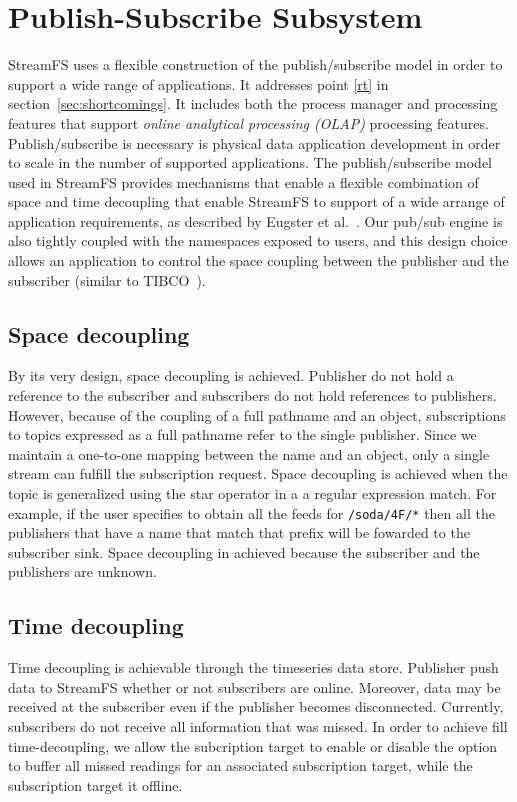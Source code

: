 \section{Publish-Subscribe Subsystem}
\label{sec:ProcMngtSchedMain}

StreamFS uses a flexible construction of the publish/subscribe model in order to support a wide range of applications.
It addresses point \ref{rt} in section~\ref{sec:shortcomings}.  It includes both the process manager and processing
features that support \emph{online analytical processing (OLAP)} processing features.
Publish/subscribe is necessary is physical data application development in order to scale in the number of supported
applications.  The publish/subscribe model used in StreamFS provides mechanisms that enable a flexible combination 
of space and time decoupling that enable StreamFS to support of a wide arrange of application requirements, as described by
Eugster et al.~\cite{eugster}.
Our pub/sub engine is also tightly coupled with the namespaces exposed to users, and this design choice allows an application
to control the space coupling between the publisher and the subscriber (similar to TIBCO~\cite{tibco}).  

\subsection{Space decoupling}
By its very design, space decoupling is achieved.  Publisher do not hold a reference to the subscriber and subscribers do not
hold references to publishers.  However, because of the coupling of a full pathname and an object, subscriptions to topics
expressed as a full pathname refer to the single publisher.  Since we maintain a one-to-one mapping between the
name and an object, only a single stream can fulfill the subscription request.  Space decoupling is achieved when the 
topic is generalized using the star operator in a a regular expression match.  For example, if the user specifies
to obtain all the feeds for \texttt{/soda/4F/*} then all the publishers that have a name that match that prefix will be fowarded
to the subscriber sink.  Space decoupling in achieved because the subscriber and the publishers are unknown.

\subsection{Time decoupling}
Time decoupling is achievable through the timeseries data store.  Publisher push data to StreamFS whether or not subscribers are
online.  Moreover, data may be received at the subscriber even if the publisher becomes disconnected.  Currently, subscribers do
not receive all information that was missed.  In order to achieve fill time-decoupling, we allow the subcription
target to enable or disable the option to buffer all missed readings for an associated subscription target, while the subscription
target it offline.

